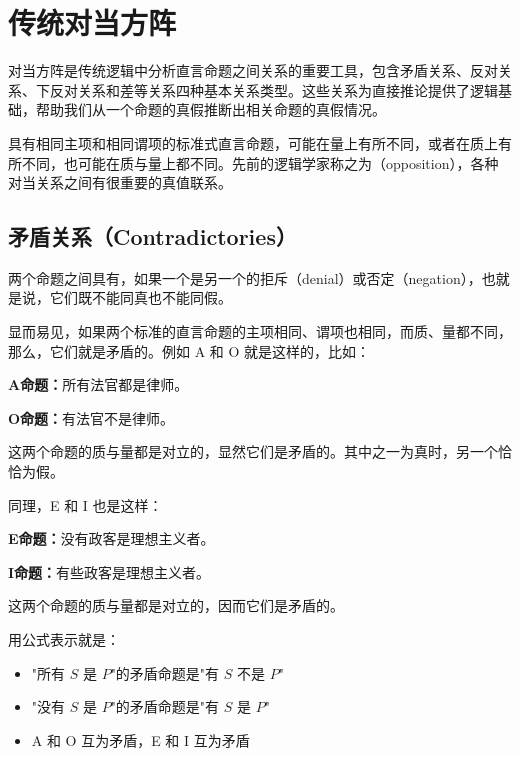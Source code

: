 \section{传统对当方阵}

\begin{logicbox}[title=章节导读]
对当方阵是传统逻辑中分析直言命题之间关系的重要工具，包含矛盾关系、反对关系、下反对关系和差等关系四种基本关系类型。这些关系为直接推论提供了逻辑基础，帮助我们从一个命题的真假推断出相关命题的真假情况。
\end{logicbox}

具有相同主项和相同谓项的标准式直言命题，可能在量上有所不同，或者在质上有所不同，也可能在质与量上都不同。先前的逻辑学家称之为（opposition），各种对当关系之间有很重要的真值联系。

\subsection{矛盾关系（Contradictories）}

\begin{theorembox}[title=矛盾关系定义]
两个命题之间具有，如果一个是另一个的拒斥（denial）或否定（negation），也就是说，它们既不能同真也不能同假。
\end{theorembox}

显而易见，如果两个标准的直言命题的主项相同、谓项也相同，而质、量都不同，那么，它们就是矛盾的。例如 A 和 O 就是这样的，比如：

\begin{examplebox}[title=矛盾关系示例]
\textbf{A命题：}所有法官都是律师。

\textbf{O命题：}有法官不是律师。

这两个命题的质与量都是对立的，显然它们是矛盾的。其中之一为真时，另一个恰恰为假。
\end{examplebox}

同理，E 和 I 也是这样：

\begin{examplebox}[title=另一组矛盾关系]
\textbf{E命题：}没有政客是理想主义者。

\textbf{I命题：}有些政客是理想主义者。

这两个命题的质与量都是对立的，因而它们是矛盾的。
\end{examplebox}

\begin{notebox}[title=矛盾关系公式]
用公式表示就是：
\begin{itemize}
\item "所有 $S$ 是 $P$"的矛盾命题是"有 $S$ 不是 $P$"
\item "没有 $S$ 是 $P$"的矛盾命题是"有 $S$ 是 $P$"
\item A 和 O 互为矛盾，E 和 I 互为矛盾
\end{itemize}
\end{notebox}

